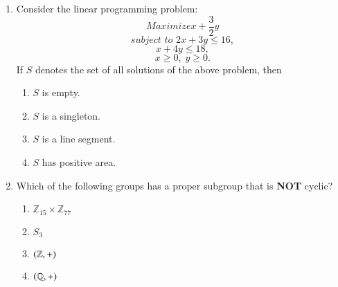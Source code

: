 \documentclass[journal]{IEEEtran}
\begin{document}
\begin{enumerate}
\item Consider the linear programming problem:
\[
Maximize  x + \frac{3}{2} y
\]
\[
 subject\,\,to\,\,2x + 3y \leq 16,
\]
\[
x + 4y \leq 18,
\]
\[
x \geq 0, \; y \geq 0.
\]
If $S$ denotes the set of all solutions of the above problem, then
\begin{multicols}{2}
\begin{enumerate}
    \item $S$ is empty.
    \item $S$ is a singleton.
    \item $S$ is a line segment.
    \item $S$ has positive area.
\end{enumerate}
\end{multicols}
\item Which of the following groups has a proper subgroup that is \textbf{NOT} cyclic?
\begin{enumerate}
    \item  $ \mathbb{Z}_{15} \times \mathbb{Z}_{77} $
    \item  $ S_3 $
    \item  $ \left(\mathbb{Z}, +\right) $
    \item  $ \left(\mathbb{Q}, +\right) $
\end{enumerate}


\end{enumerate}
\end{document}
